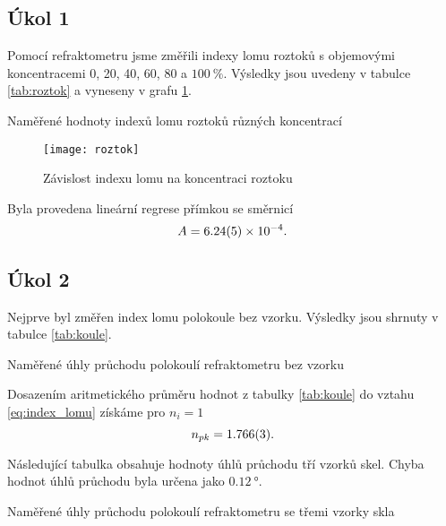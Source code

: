 \documentclass{protokol}
\begin{document}
    \subsection*{Úkol 1}

      Pomocí refraktometru jsme změřili indexy lomu roztoků s objemovými koncentracemi 0, 20, 40, 60, 80 a $\SI{100}{\percent}$. Výsledky jsou uvedeny v tabulce \ref{tab:roztok} a vyneseny v grafu \ref{fig:roztok}.

      \begin{table}[H]
        \centering
        \setlength{\tabcolsep}{10pt}
        
        \caption{Naměřené hodnoty indexů lomu roztoků různých koncentrací}
        \label{tab:roztok}
      \end{table}

      \begin{figure}[H]
        \centering
        \texttt{[image: roztok]}
        \caption{Závislost indexu lomu na koncentraci roztoku}
        \label{fig:roztok}
      \end{figure}

      Byla provedena lineární regrese přímkou se směrnicí 
      $$ A = \SI{6.24 \pm 0.05 e-4}{}. $$

    \subsection*{Úkol 2}

      Nejprve byl změřen index lomu polokoule bez vzorku. Výsledky jsou shrnuty v tabulce \ref{tab:koule}.

      \begin{table}[H]
        \centering
        \setlength{\tabcolsep}{10pt}
        
        \caption{Naměřené úhly průchodu polokoulí refraktometru bez vzorku}
        \label{tab:koule}
      \end{table}

      Dosazením aritmetického průměru hodnot z tabulky \ref{tab:koule} do vztahu \eqref{eq:index_lomu} získáme pro $n_i = 1$
      $$ n_{pk} = \SI{1.766 \pm 0.003}{}. $$

      Následující tabulka obsahuje hodnoty úhlů průchodu tří vzorků skel. Chyba hodnot úhlů průchodu byla určena jako $\SI{0.12}{\degree}$.

      \begin{table}[H]
        \centering
        \setlength{\tabcolsep}{10pt}
        
        \caption{Naměřené úhly průchodu polokoulí refraktometru se třemi vzorky skla}
        \label{tab:skla}
      \end{table}
\end{document}
